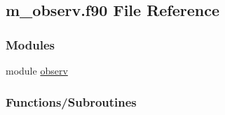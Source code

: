 \hypertarget{m__observ_8f90}{}\subsection{m\+\_\+observ.\+f90 File Reference}
\label{m__observ_8f90}
\subsubsection*{Modules}
\begin{DoxyCompactItemize}
\item 
module \hyperlink{namespaceobserv}{observ}
\end{DoxyCompactItemize}
\subsubsection*{Functions/\+Subroutines}
